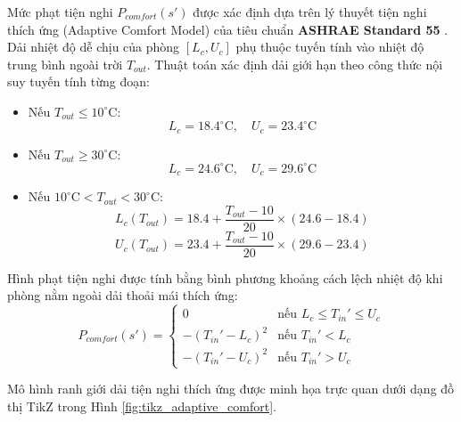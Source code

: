 \documentclass[12pt, a4paper]{article}
\begin{document}
Mức phạt tiện nghi $P_{comfort}(s')$ được xác định dựa trên lý thuyết tiện nghi thích ứng (Adaptive Comfort Model) của tiêu chuẩn \textbf{ASHRAE Standard 55} \cite{ashrae55}. Dải nhiệt độ dễ chịu của phòng $[L_c, U_c]$ phụ thuộc tuyến tính vào nhiệt độ trung bình ngoài trời $T_{out}$. Thuật toán xác định dải giới hạn theo công thức nội suy tuyến tính từng đoạn:
\begin{itemize}
    \item Nếu $T_{out} \le 10^\circ\text{C}$:
    \begin{equation}
    L_c = 18.4^\circ\text{C}, \quad U_c = 23.4^\circ\text{C}
    \end{equation}
    \item Nếu $T_{out} \ge 30^\circ\text{C}$:
    \begin{equation}
    L_c = 24.6^\circ\text{C}, \quad U_c = 29.6^\circ\text{C}
    \end{equation}
    \item Nếu $10^\circ\text{C} < T_{out} < 30^\circ\text{C}$:
    \begin{equation}
    L_c(T_{out}) = 18.4 + \frac{T_{out} - 10}{20} \times (24.6 - 18.4)
    \end{equation}
    \begin{equation}
    U_c(T_{out}) = 23.4 + \frac{T_{out} - 10}{20} \times (29.6 - 23.4)
    \end{equation}
\end{itemize}

Hình phạt tiện nghi được tính bằng bình phương khoảng cách lệch nhiệt độ khi phòng nằm ngoài dải thoải mái thích ứng:
\begin{equation}
P_{comfort}(s') = \begin{cases}
0 & \text{nếu } L_c \le T_{in}' \le U_c \\
-(T_{in}' - L_c)^2 & \text{nếu } T_{in}' < L_c \\
-(T_{in}' - U_c)^2 & \text{nếu } T_{in}' > U_c
\end{cases}
\end{equation}

Mô hình ranh giới dải tiện nghi thích ứng được minh họa trực quan dưới dạng đồ thị TikZ trong Hình \ref{fig:tikz_adaptive_comfort}.
\end{document}
